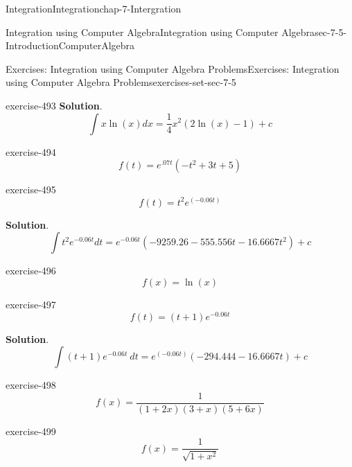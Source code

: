 \documentclass[oneside,10pt,]{book}
\numberwithin{equation}{section}
\begin{document}
\begin{chapterptx}{Integration}{}{Integration}{}{}{chap-7-Intergration}
\begin{sectionptx}{Integration using Computer Algebra}{}{Integration using Computer Algebra}{}{}{sec-7-5-IntroductionComputerAlgebra}
\begin{exercises-subsection-numberless}{Exercises: Integration using Computer Algebra Problems}{}{Exercises: Integration using Computer Algebra Problems}{}{}{exercises-set-sec-7-5}
\begin{divisionexercise}{1}{}{}{exercise-493}
\noindent\textbf{Solution}.\hypertarget{solution-250}{}\quad%
%
\begin{equation*}
\int x \ln(x)dx=\frac{1}{4} x^{2}(2\ln(x)-1) +c
\end{equation*}
\end{divisionexercise}%
\begin{divisionexercise}{2}{}{}{exercise-494}%
%
\begin{equation*}
f(t)=e^{.07t} (-t^2+3t+5)
\end{equation*}
\end{divisionexercise}%
\begin{divisionexercise}{3}{}{}{exercise-495}%
%
\begin{equation*}
f(t)=t^2 e^(-0.06t)
\end{equation*}
\par\smallskip%
\noindent\textbf{Solution}.\hypertarget{solution-251}{}\quad%
%
\begin{equation*}
\int t^2 e^{-0.06 t} dt= e^{-0.06t} (-9259.26 - 555.556 t - 16.6667 t^2)+c
\end{equation*}
\end{divisionexercise}%
\begin{divisionexercise}{4}{}{}{exercise-496}%
%
\begin{equation*}
f(x)=\ln(x)
\end{equation*}
\end{divisionexercise}%
\begin{divisionexercise}{5}{}{}{exercise-497}%
%
\begin{equation*}
f(t)=(t+1) e^{-0.06t}
\end{equation*}
\par\smallskip%
\noindent\textbf{Solution}.\hypertarget{solution-252}{}\quad%
%
\begin{equation*}
\int (t+1) e^{-0.06t}\ dt =e^(-0.06t) (-294.444 - 16.6667 t)+c
\end{equation*}
\end{divisionexercise}%
\begin{divisionexercise}{6}{}{}{exercise-498}%
%
\begin{equation*}
f(x)=\frac{1}{(1+2x)(3+x)(5+6x) }
\end{equation*}
\end{divisionexercise}%
\begin{divisionexercise}{7}{}{}{exercise-499}%
%
\begin{equation*}
f(x)=\frac{1}{\sqrt{1+x^2}}
\end{equation*}
\par\smallskip%

\end{divisionexercise}
\end{exercises-subsection-numberless}
\end{sectionptx}
\end{chapterptx}
\end{document}
